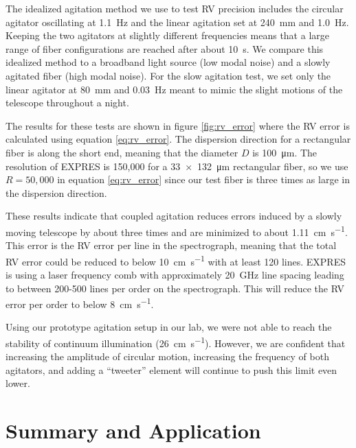 \documentclass[twocolumn]{emulateapj}
\begin{document}
The idealized agitation method we use to test RV precision includes the circular agitator oscillating at \SI{1.1}{\hertz} and the linear agitation set at \SI{240}{\milli\meter} and \SI{1.0}{\hertz}. Keeping the two agitators at slightly different frequencies means that a large range of fiber configurations are reached after about \SI{10}{\second}. We compare this idealized method to a broadband light source (low modal noise) and a slowly agitated fiber (high modal noise). For the slow agitation test, we set only the linear agitator at \SI{80}{\milli\meter} and \SI{0.03}{\hertz} meant to mimic the slight motions of the telescope throughout a night.

The results for these tests are shown in figure \ref{fig:rv_error} where the RV error is calculated using equation \ref{eq:rv_error}. The dispersion direction for a rectangular fiber is along the short end, meaning that the diameter $D$ is \SI{100}{\micro\meter}. The resolution of EXPRES is 150,000 for a \SI{33x132}{\micro\meter} rectangular fiber, so we use $R=50,000$ in equation \ref{eq:rv_error} since our test fiber is three times as large in the dispersion direction.


These results indicate that coupled agitation reduces errors induced by a slowly moving telescope by about three times and are minimized to about \SI{1.11}{\centi\meter\per\second}. This error is the RV error per line in the spectrograph, meaning that the total RV error could be reduced to below \SI{10}{\centi\meter\per\second} with at least 120 lines. EXPRES is using a laser frequency comb with approximately \SI{20}{\giga\hertz} line spacing leading to between 200-500 lines per order on the spectrograph. This will reduce the RV error per order to below \SI{8}{\centi\meter\per\second}.

Using our prototype agitation setup in our lab, we were not able to reach the stability of continuum illumination (\SI{26}{\centi\meter\per\second}). However, we are confident that increasing the amplitude of circular motion, increasing the frequency of both agitators, and adding a ``tweeter'' element will continue to push this limit even lower.

\section{Summary and Application}
\label{sec:conclusions}
\end{document}
